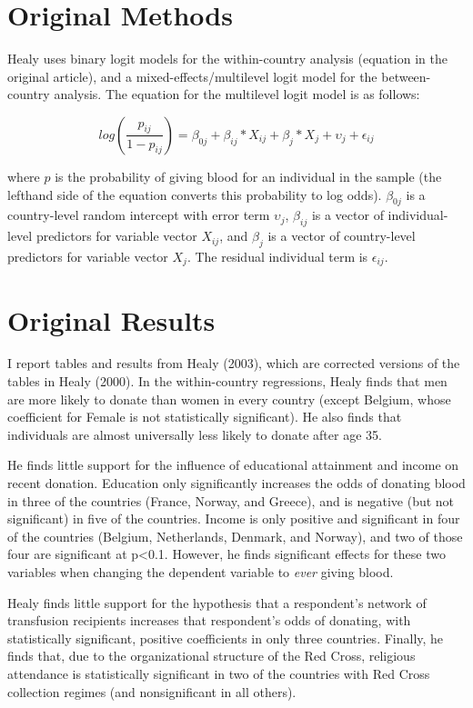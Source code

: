 \documentclass[11pt,article,oneside]{memoir}
\begin{document}
\section{Original Methods}\label{original-methods}

Healy uses binary logit models for the within-country analysis (equation in the original article), and a mixed-effects/multilevel logit model for the between-country analysis. The equation for the multilevel logit model is as follows:

\[log \left(\frac{p_{ij}}{1-p_{ij}}\right) = \beta_{0j} + \beta_{ij} * X_{ij} + \beta_{j} * X_{j}+ \upsilon_{j} + \epsilon_{ij}\]

where $p$ is the probability of giving blood for an individual in the
sample (the lefthand side of the equation converts this probability to
log odds). $\beta_{0j}$ is a country-level random intercept with error
term $\upsilon_{j}$, $\beta_{ij}$ is a vector of individual-level
predictors for variable vector $X_{ij}$, and $\beta_{j}$ is a vector of
country-level predictors for variable vector $X_{j}$. The residual individual term is $\epsilon_{ij}$.

\section{Original Results}\label{original-results}

I report tables and results from Healy (2003), which are corrected
versions of the tables in Healy (2000). In the within-country
regressions, Healy finds that men are more likely to donate than women
in every country (except Belgium, whose coefficient for Female is not
statistically significant). He also finds that individuals are almost
universally less likely to donate after age 35.

He finds little support for the influence of educational attainment and
income on recent donation. Education only significantly increases the
odds of donating blood in three of the countries (France, Norway, and
Greece), and is negative (but not significant) in five of the countries.
Income is only positive and significant in four of the countries
(Belgium, Netherlands, Denmark, and Norway), and two of those four are
significant at p\textless{}0.1. However, he finds significant effects for these two variables when changing the dependent variable to \emph{ever} giving blood.

Healy finds little support for the hypothesis that a respondent's
network of transfusion recipients increases that respondent's odds of
donating, with statistically significant, positive coefficients in only
three countries. Finally, he finds that, due to the organizational structure of the Red Cross, religious attendance is
statistically significant in two of the countries with Red Cross
collection regimes (and nonsignificant in all others).
\end{document}
